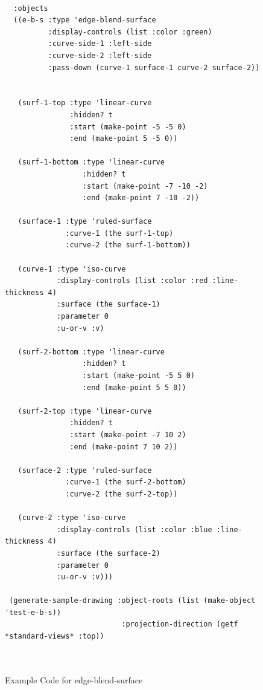 \documentclass [11pt]{book}
\begin{document}
\begin{itemize}
\begin{figure}
\begin{lrbox}{\boxedverb}
\begin{minipage}{\linewidth}
{\begin{verbatim}
  
  :objects
  ((e-b-s :type 'edge-blend-surface
          :display-controls (list :color :green)
          :curve-side-1 :left-side
          :curve-side-2 :left-side
          :pass-down (curve-1 surface-1 curve-2 surface-2))
                                    
   
   (surf-1-top :type 'linear-curve
               :hidden? t
               :start (make-point -5 -5 0)
               :end (make-point 5 -5 0))
    
   (surf-1-bottom :type 'linear-curve
                  :hidden? t
                  :start (make-point -7 -10 -2)
                  :end (make-point 7 -10 -2))
    
   (surface-1 :type 'ruled-surface
              :curve-1 (the surf-1-top)
              :curve-2 (the surf-1-bottom))
    
   (curve-1 :type 'iso-curve
            :display-controls (list :color :red :line-thickness 4)
            :surface (the surface-1)
            :parameter 0
            :u-or-v :v)
    
   (surf-2-bottom :type 'linear-curve
                  :hidden? t
                  :start (make-point -5 5 0)
                  :end (make-point 5 5 0))
    
   (surf-2-top :type 'linear-curve
               :hidden? t
               :start (make-point -7 10 2)
               :end (make-point 7 10 2))
    
   (surface-2 :type 'ruled-surface
              :curve-1 (the surf-2-bottom)
              :curve-2 (the surf-2-top))
    
   (curve-2 :type 'iso-curve
            :display-controls (list :color :blue :line-thickness 4)
            :surface (the surface-2)
            :parameter 0
            :u-or-v :v)))

 (generate-sample-drawing :object-roots (list (make-object 'test-e-b-s))
                           :projection-direction (getf *standard-views* :top))

 
\end{verbatim}}
\end{minipage}
\end{lrbox}
\fbox{\usebox{\boxedverb}}

\caption{Example Code for edge-blend-surface}

\label{fig:example-code-edge-blend-surface}

\end{figure}


\end{itemize}
\end{document}

